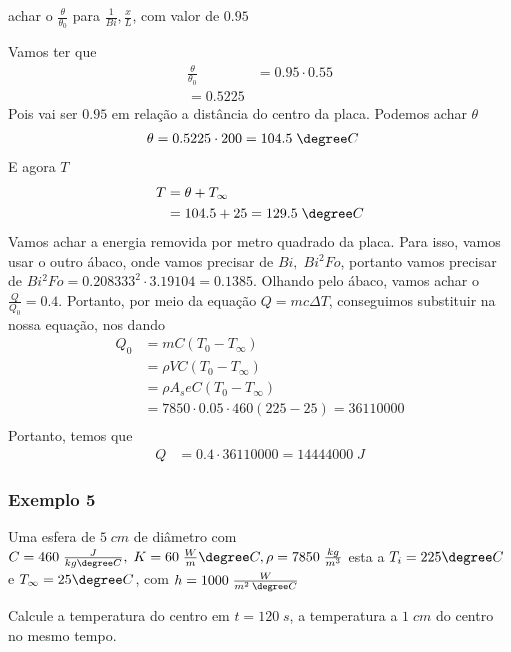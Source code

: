 achar o \(\frac{\theta}{\theta _0}\) para \(\frac{1}{Bi}, \frac{x}{L}\), com valor de \(0.95\) \par
Vamos ter que
\begin{align}
    \frac{\theta}{\theta _0} &= 0.95 \cdot 0.55\\
    = 0.5225
\end{align}
Pois vai ser \(0.95\) em relação a distância do centro da placa. Podemos achar \(\theta \)
\begin{align}
    \theta &= 0.5225 \cdot 200 = 104.5 \; \degree C
\end{align}
E agora \(T\)
\begin{align}
    T &= \theta + T_\infty \\
    &= 104.5 + 25 = 129.5 \; \degree C
\end{align}
Vamos achar a energia removida por metro quadrado da placa. Para isso, vamos usar o outro ábaco,
onde vamos precisar de \(Bi, \;Bi^{2} Fo\), portanto vamos precisar de \(Bi^{2} Fo = 0.208333^{2}
\cdot 3.19104  = 0.1385\). Olhando pelo ábaco, vamos achar o \(\frac{Q}{Q_0} = 0.4\). Portanto, por
meio da equação \(Q = mc \Delta T\), conseguimos substituir na nossa equação, nos dando
\begin{align}
    Q_0 &= m C \left( T_0 - T_\infty  \right)\\
    &= \rho V C \left( T_0 - T_\infty  \right)\\
    &= \rho A_s e C \left( T_0 - T_\infty  \right)\\
    &= 7850 \cdot 0.05 \cdot 460 \left( 225 - 25  \right) = 36110000\\
\end{align}
Portanto, temos que
\begin{align}
    Q &= 0.4 \cdot 36110000 = 14444000 \; J
\end{align}
\subsubsection{Exemplo 5}
Uma esfera de \(5 \; cm\) de diâmetro com \(C= 460\; \frac{J}{kg\degree C}, \; K = 60 \; \frac{W}{m}
\degree C, \rho = 7850 \; \frac{kg}{m^3}\)  esta a \(T_{i} = 225 \degree C\) e \(T_{\infty} = 25
\degree C\), com \(h = 1000 \; \frac{W}{m^{2} \: \degree C}\) \par
Calcule a temperatura do centro em \(t = 120 \; s\), a temperatura a \(1 \; cm\) do centro no mesmo
tempo.
